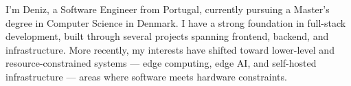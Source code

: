 

I'm Deniz, a Software Engineer from Portugal, currently pursuing a Master's degree in Computer Science in Denmark.
I have a strong foundation in full-stack development, built through several projects spanning frontend, backend, and infrastructure.
More recently, my interests have shifted toward lower-level and resource-constrained systems
 — edge computing, edge AI, and self-hosted infrastructure — areas where software meets hardware constraints.
